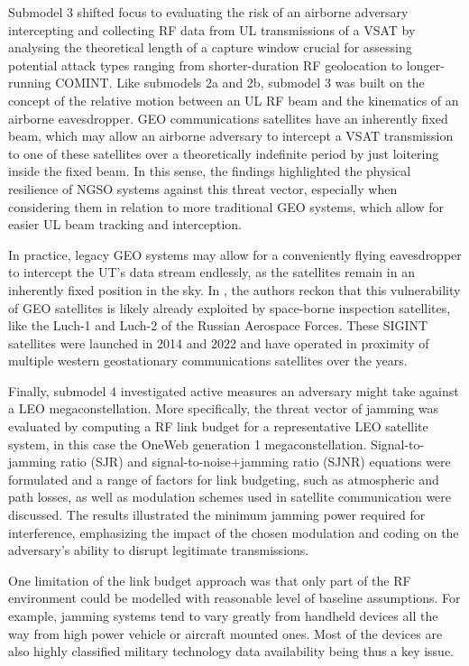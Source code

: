 \documentclass[english, 12pt, a4paper, elec, utf8, a-1b, online]{aaltothesis}
\begin{document}
Submodel 3 shifted focus to evaluating the risk of an airborne adversary intercepting and collecting RF data from UL transmissions of a VSAT by analysing the theoretical length of a capture window crucial for assessing potential attack types ranging from shorter-duration RF geolocation to longer-running COMINT.
Like submodels 2a and 2b, submodel 3 was built on the concept of the relative motion between an UL RF beam and the kinematics of an airborne eavesdropper. GEO communications satellites have an inherently fixed beam, which may allow an airborne adversary to intercept a VSAT transmission to one of these satellites over a theoretically indefinite period by just loitering inside the fixed beam.
In this sense, the findings highlighted the physical resilience of NGSO systems against this threat vector, especially when considering them in relation to more traditional GEO systems, which allow for easier UL beam tracking and interception.

In practice, legacy GEO systems may allow for a conveniently flying eavesdropper to intercept the UT's data stream endlessly, as the satellites remain in an inherently fixed position in the sky.
In \cite{bingen2023space}, the authors reckon that this vulnerability of GEO satellites is likely already exploited by space-borne inspection satellites, like the Luch-1 and Luch-2 of the Russian Aerospace Forces.
These SIGINT satellites were launched in 2014 and 2022 and have operated in proximity of multiple western geostationary communications satellites over the years.

Finally, submodel 4 investigated active measures an adversary might take against a LEO megaconstellation. More specifically, the threat vector of jamming was evaluated by computing a RF link budget for a representative LEO satellite system, in this case the OneWeb generation 1 megaconstellation.
Signal-to-jamming ratio (SJR) and signal-to-noise+jamming ratio (SJNR) equations were formulated and a range of factors for link budgeting, such as atmospheric and path losses, as well as modulation schemes used in satellite communication were discussed.
The results illustrated the minimum jamming power required for interference, emphasizing the impact of the chosen modulation and coding on the adversary's ability to disrupt legitimate transmissions. 

One limitation of the link budget approach was that only part of the RF environment could be modelled with reasonable level of baseline assumptions. For example, jamming systems tend to vary greatly from handheld devices all the way from high power vehicle or aircraft mounted ones. Most of the devices are also highly classified military technology data availability being thus a key issue.
\end{document}
